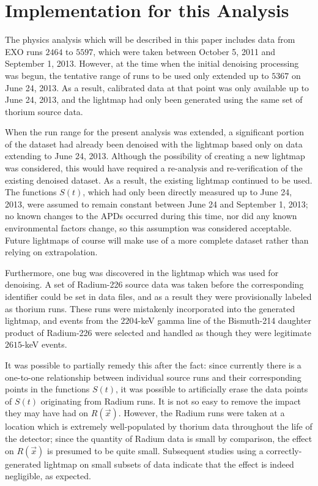 \section{Implementation for this Analysis}\label{sec:LightmapImplementationDetails}

The physics analysis which will be described in this paper includes data from EXO runs $2464$ to $5597$, which were taken between October 5, 2011 and September 1, 2013.  However, at the time when the initial denoising processing was begun, the tentative range of runs to be used only extended up to $5367$ on June 24, 2013.  As a result, calibrated data at that point was only available up to June 24, 2013, and the lightmap had only been generated using the same set of thorium source data.

When the run range for the present analysis was extended, a significant portion of the dataset had already been denoised with the lightmap based only on data extending to June 24, 2013.  Although the possibility of creating a new lightmap was considered, this would have required a re-analysis and re-verification of the existing denoised dataset.  As a result, the existing lightmap continued to be used.  The functions $S(t)$, which had only been directly measured up to June 24, 2013, were assumed to remain constant between June 24 and September 1, 2013; no known changes to the APDs occurred during this time, nor did any known environmental factors change, so this assumption was considered acceptable.  Future lightmaps of course will make use of a more complete dataset rather than relying on extrapolation.

Furthermore, one bug was discovered in the lightmap which was used for denoising.  A set of Radium-226 source data was taken before the corresponding identifier could be set in data files, and as a result they were provisionally labeled as thorium runs.  These runs were mistakenly incorporated into the generated lightmap, and events from the $2204$-keV gamma line of the Bismuth-214 daughter product of Radium-226 were selected and handled as though they were legitimate $2615$-keV events.

It was possible to partially remedy this after the fact: since currently there is a one-to-one relationship between individual source runs and their corresponding points in the functions $S(t)$, it was possible to artificially erase the data points of $S(t)$ originating from Radium runs.  It is not so easy to remove the impact they may have had on $R(\vec{x})$.  However, the Radium runs were taken at a location which is extremely well-populated by thorium data throughout the life of the detector; since the quantity of Radium data is small by comparison, the effect on $R(\vec{x})$ is presumed to be quite small.  Subsequent studies using a correctly-generated lightmap on small subsets of data indicate that the effect is indeed negligible, as expected.

